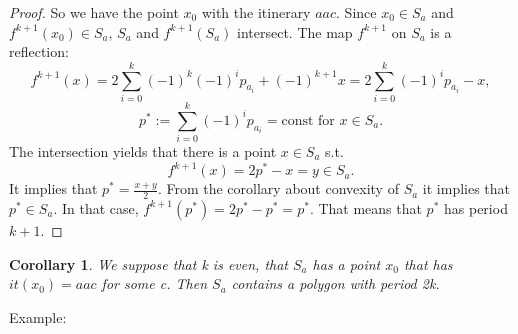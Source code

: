 \documentclass[a4paper, 12pt]{article}
\newtheorem{cor}{Corollary}
\begin{document}
\begin{proof} So we have the point $x_0$ with the itinerary $aac$.\newline
Since $x_0\in S_a$ and $f^{k+1}(x_0)\in S_a$, $S_a$ and  $f^{k+1}(S_a)$ intersect.\newline
The map $f^{k+1}$ on $S_a$ is a reflection:\newline
\[f^{k+1}(x)=2\sum\limits_{i = 0}^{k}(-1)^{k}(-1)^{i}p_{a_i}+(-1)^{k+1}x=2\sum\limits_{i = 0}^{k}(-1)^{i}p_{a_i}-x,\]
\[p^{\ast}:=\sum\limits_{i = 0}^{k}(-1)^{i}p_{a_i}=\text{const for } x\in S_a.\]
The intersection yields that there is a point $x\in S_a$ s.t.
\[f^{k+1}(x)=2p^{\ast}-x=y\in S_a.\]
It implies that $p^{\ast}=\frac{x+y}{2}$. From the corollary about convexity of $S_a$ it implies that $p^{\ast}\in S_a$. In that case, $f^{k+1}(p^{\ast})=2p^{\ast}-p^{\ast}=p^{\ast}$. That means that $p^{\ast}$ has period $k+1$.
\end{proof}
\begin{cor} We suppose that k is even, that $S_a$ has a point $x_0$ that has $it(x_0)=aac$ for some c. Then $S_a$ contains a polygon with period 2k.
\end{cor}

Example:
\end{document}
